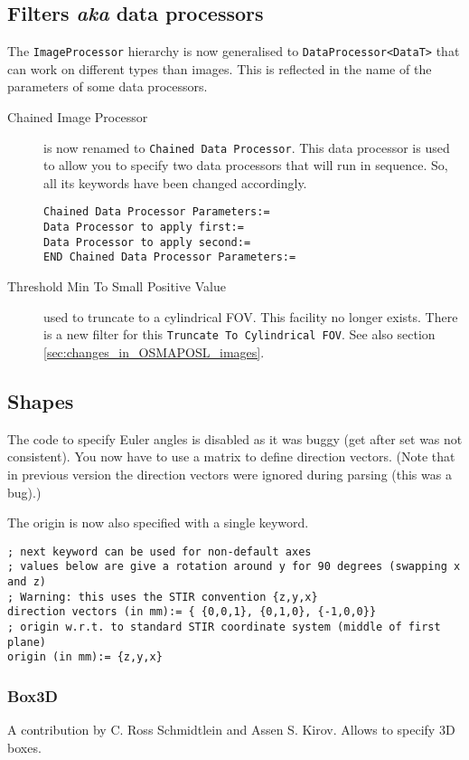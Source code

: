 \documentclass{article}
\begin{document}
\subsection{Filters \textit{aka} data processors}
The \texttt{ImageProcessor} hierarchy is now generalised to 
\texttt{DataProcessor<DataT>} that can work on different types than images. This is reflected
in the name of the parameters of some data processors.

\begin{description}
\item[Chained Image Processor]
is now renamed to \texttt{Chained Data Processor}. 
This data processor is used to allow you to specify two
data processors that will run in sequence. So, all its keywords have
been changed accordingly.
\begin{verbatim}
Chained Data Processor Parameters:=
Data Processor to apply first:= 
Data Processor to apply second:=
END Chained Data Processor Parameters:=
\end{verbatim}

\item[Threshold Min To Small Positive Value]
used to truncate to a cylindrical FOV. This facility no longer
exists. There is a new filter for this \texttt{Truncate To Cylindrical FOV}.
See also section \ref{sec:changes_in_OSMAPOSL_images}.
\end{description}


\subsection{Shapes}
The code to specify Euler angles is disabled
as it was buggy (get after set was not consistent).
You now have to  use a matrix to define direction vectors. 
(Note that in previous version the direction
vectors were ignored during parsing (this was a bug).)

The origin is now also specified with a single keyword.
\begin{verbatim}
; next keyword can be used for non-default axes
; values below are give a rotation around y for 90 degrees (swapping x and z)
; Warning: this uses the STIR convention {z,y,x}
direction vectors (in mm):= { {0,0,1}, {0,1,0}, {-1,0,0}}
; origin w.r.t. to standard STIR coordinate system (middle of first plane)
origin (in mm):= {z,y,x}
\end{verbatim}

\subsubsection{Box3D}
A contribution by C. Ross Schmidtlein and Assen S. Kirov. Allows
to specify 3D boxes.
\end{document}
